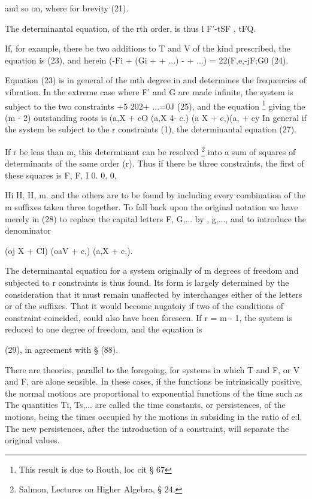 and so on, where for brevity (21).

The determinantal equation, of the rth order, is thus l F'-tSF , tFQ.

If, for example, there be two additions to T and V of the kind prescribed, the
equation is
(23),
and herein
(-Fi + (Gi + + ...) - + ...) = 22(F,e,-jF;G0  (24).

Equation (23) is in general of the mth degree in
and determines the frequencies of vibration. In the extreme case where
F' and G are made infinite, the system is subject to the two
constraints
+5 202+ ...=0J (25),
and the equation \footnote{This result is due to Routh, loc cit § 67} giving the (m - 2) outstanding
roots is (a,X + cO (a,X 4- c.) (a X + c,)(a,  + cy In general if the
system be subject to the r constraints (1), the determinantal equation (27).

If r be leas than m, this determinant can be resolved \footnote{
Salmon, Lectures on Higher Algebra, § 24.} into a sum of squares of
determinants of the same order (r). Thus if there be three constraints,
the first of these squares is F, F, I 0. 0, 0,

Hi H, H, m.  and the others are to be found by including every
combination of the m suffixes taken three together. To fall back upon
the original notation we have merely in (28) to replace the capital
letters F, G,... by , g,..., and to introduce the denominator

(oj X + Cl) (oaV + c,) (a,X + c,).

The determinantal equation for a system originally of m degrees of
freedom and subjected to r constraints is thus found. Its form is
largely determined by the consideration that it must remain unaffected
by interchanges either of the letters or of the suffixes.
That it would become nugatoiy if two of the conditions of constraint coincided,
could also have been foreseen. If r = m - 1, the system is reduced to one
degree of freedom, and the equation is

(29), in agreement with § (88).

There are theories, parallel to the foregoing, for systems in
which T and F, or V and F, are alone sensible. In these cases, if
the functions be intrinsically positive, the normal motions are
proportional to exponential functions of the time such as
The quantities Ti, Ts,... are called the time constants, or
persistences, of
the motions, being the times occupied by the motions in
subsiding in the ratio of e:l. The new persistences, after the
introduction of a constraint, will separate the original values.


